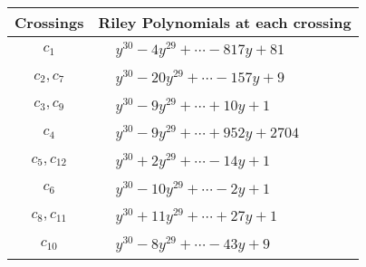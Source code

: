 \documentclass[1p]{elsarticle_modified}
\theoremstyle{definition}
\begin{document}
\begin{tabular}{m{50pt}|m{274pt}}
Crossings & \hspace{64pt}Riley Polynomials at each crossing \\
\hline $$\begin{aligned}c_{1}\end{aligned}$$&$\begin{aligned}
&y^{30}-4 y^{29}+\cdots-817 y+81
\end{aligned}$\\
\hline $$\begin{aligned}c_{2},c_{7}\end{aligned}$$&$\begin{aligned}
&y^{30}-20 y^{29}+\cdots-157 y+9
\end{aligned}$\\
\hline $$\begin{aligned}c_{3},c_{9}\end{aligned}$$&$\begin{aligned}
&y^{30}-9 y^{29}+\cdots+10 y+1
\end{aligned}$\\
\hline $$\begin{aligned}c_{4}\end{aligned}$$&$\begin{aligned}
&y^{30}-9 y^{29}+\cdots+952 y+2704
\end{aligned}$\\
\hline $$\begin{aligned}c_{5},c_{12}\end{aligned}$$&$\begin{aligned}
&y^{30}+2 y^{29}+\cdots-14 y+1
\end{aligned}$\\
\hline $$\begin{aligned}c_{6}\end{aligned}$$&$\begin{aligned}
&y^{30}-10 y^{29}+\cdots-2 y+1
\end{aligned}$\\
\hline $$\begin{aligned}c_{8},c_{11}\end{aligned}$$&$\begin{aligned}
&y^{30}+11 y^{29}+\cdots+27 y+1
\end{aligned}$\\
\hline $$\begin{aligned}c_{10}\end{aligned}$$&$\begin{aligned}
&y^{30}-8 y^{29}+\cdots-43 y+9
\end{aligned}$\\
\hline
\end{tabular}\\~\\
\end{document}
